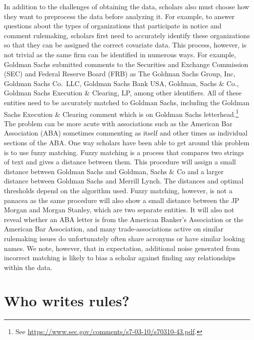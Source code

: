 \documentclass[12pt,notitlepage]{article}
\newcounter{cor}
\begin{document}
In addition to the challenges of obtaining the data, scholars also must
choose how they want to preprocess the data before analyzing it. For
example, to answer questions about the types of organizations that
participate in notice and comment rulemaking, scholars first need to
accurately identify these organizations so that they can be assigned the
correct covariate data. This process, however, is not trivial as the
same firm can be identified in numerous ways. For example, Goldman Sachs
submitted comments to the Securities and Exchange Commission (SEC) and
Federal Reserve Board (FRB) as The Goldman Sachs Group, Inc, Goldman
Sachs Co.~LLC, Goldman Sachs Bank USA, Goldman, Sachs \& Co., Goldman
Sachs Execution \& Clearing, LP, among other identifiers. All of these
entities need to be accurately matched to Goldman Sachs, including the
Goldman Sachs Execution \& Clearing comment which is on Goldman Sachs
letterhead.\footnote{See
  \url{https://www.sec.gov/comments/s7-03-10/s70310-43.pdf}.} The
problem can be more acute with associations such as the American Bar
Association (ABA) sometimes commenting as itself and other times as
individual sections of the ABA. One way scholars have been able to get
around this problem is to use fuzzy matching. Fuzzy matching is a
process that compares two strings of text and gives a distance between
them. This procedure will assign a small distance between Goldman Sachs
and Goldman, Sachs \& Co and a larger distance between Goldman Sachs and
Merrill Lynch. The distances and optimal thresholds depend on the
algorithm used. Fuzzy matching, however, is not a panacea as the same
procedure will also show a small distance between the JP Morgan and
Morgan Stanley, which are two separate entities. It will also not reveal
whether an ABA letter is from the American Banker's Association or the
American Bar Association, and many trade-associations active on similar
rulemaking issues do unfortunately often share acronyms or have similar
looking names. We note, however, that in expectation, additional noise
generated from incorrect matching is likely to bias a scholar against
finding any relationships within the data.

\hypertarget{who-writes-rules}{%
\section{Who writes rules?}\label{who-writes-rules}}
\end{document}
